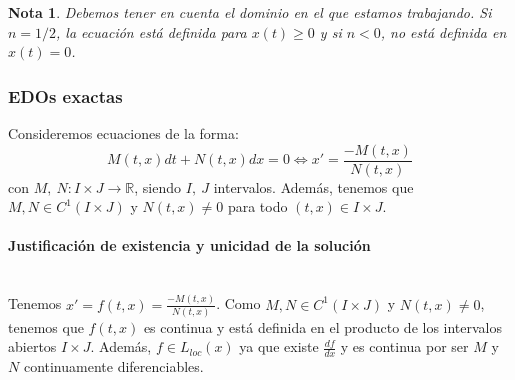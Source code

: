 \documentclass{article}
\theoremstyle{theorem-style}  %
\theoremstyle{definition-style}
\newtheorem*{note}{Nota} %
\theoremstyle{example-style}
\begin{document}
\begin{note}
	Debemos tener en cuenta el dominio en el que estamos trabajando. Si $ n=1/2 $, la ecuación está definida para $ x(t)\geq 0 $ y si $ n<0 $, no está definida en $ x(t)=0 $.
\end{note}

\subsubsection{EDOs exactas}
	Consideremos ecuaciones de la forma:
	\begin{equation} \label{eqEx}
	M(t, x)dt + N(t, x)dx = 0 \Leftrightarrow x'=\frac{-M(t, x)}{N(t, x)}
	\end{equation}
	con $M, \ N: I \times J \longrightarrow \mathbb{R}$, siendo $I, \ J$ intervalos. Además, tenemos que $M, N \in C^1(I\times J)$ y $N(t, x) \neq 0$ para todo $(t, x) \in I \times J$.
	
	\paragraph{Justificación de existencia y unicidad de la solución}\ \\
	Tenemos $ x'=f(t,x)= \frac{-M(t, x)}{N(t, x)}$. Como  $M, N \in C^1(I\times J)$ y $N(t, x) \neq 0$, tenemos que $ f(t,x) $ es continua y está definida en el producto de los intervalos abiertos $ I \times J $. Además, $ f\in L_{loc}(x) $ ya que existe $ \frac{df}{dx} $ y es continua por ser $ M $ y $ N $ continuamente diferenciables. 
	
\end{document}
